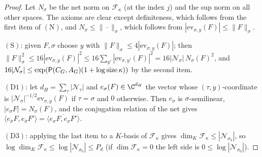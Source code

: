 \begin{proof}
Let $N_\sigma$ be the net norm on $\mathcal F_\kappa$ (at the index $j$) and the sup norm on all other spaces. The axioms are
clear except definiteness, which follows from the first item of $(\mathrm N)$, and $N_\sigma\le\|\cdot\|_\sigma$, which
follows from $|\mathrm{ev}_{\sigma,y}(F)|\le\|F\|_\sigma$.

$(\mathrm S)$: given $F,\sigma$ choose $y$ with $\|F\|_\sigma\le4|\mathrm{ev}_{\sigma,y}(F)|$; then
$\|F\|_\sigma^2\le16|\mathrm{ev}_{\sigma,y}(F)|^2\le16\sum_{y'}|\mathrm{ev}_{\sigma,y'}(F)|^2=16|\mathcal N_\sigma|\,N_\sigma(F)^2$, and
$16|\mathcal N_\sigma|\le\exp(\mathsf{P}(C_G,A_G)(1+\log\operatorname{size}\kappa))$ by the second item.

$(\mathrm D1)$: let $d_H=\sum_\tau|\mathcal N_\tau|$ and $e_\sigma(F)\in\C^{d_H}$ the vector whose $(\tau,y)$-coordinate is
$|\mathcal N_\sigma|^{-1/2}\mathrm{ev}_{\sigma,y}(F)$ if $\tau=\sigma$ and $0$ otherwise. Then $e_\sigma$ is $\sigma$-semilinear,
$|e_\sigma F|=N_\sigma(F)$, and the conjugation relation of the net gives
$\langle e_{\bar\sigma}F,e_{\bar\sigma}F'\rangle=\overline{\langle e_\sigma F,e_\sigma F'\rangle}$.

$(\mathrm D3)$: applying the last item to a $K$-basis of $\mathcal F_\kappa$ gives $\dim_K\mathcal F_\kappa\le|\mathcal N_{\sigma_0}|$, so
$\log\dim_K\mathcal F_\kappa\le\log|\mathcal N_{\sigma_0}|\le P_d$ (if $\dim\mathcal F_\kappa=0$ the left side is $0\le
\log|\mathcal N_{\sigma_0}|$).
\end{proof}

